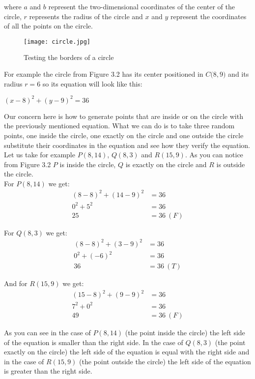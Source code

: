 where $a$ and $b$ represent the two-dimensional coordinates of the center of the circle, $r$ represents the radius of the circle and $x$ and $y$ represent the coordinates of all the points on the circle.\\

\begin{figure}[h]
	\caption{Testing the borders of a circle}
	\centering
	\texttt{[image: circle.jpg]}
\end{figure}

For example the circle from Figure 3.2 has its center positioned in $C\big(8, 9\big)$ and its radius $r = 6$ so its equation will look like this:

\begin{center}
	$(x - 8) ^ 2 + (y - 9) ^ 2 = 36$
\end{center}

\newpage
Our concern here is how to generate points that are inside or on the circle with the previously mentioned equation. What we can do is to take three random points, one inside the circle, one exactly on the circle and one outside the circle substitute their coordinates in the equation and see how they verify the equation. Let us take for example $P(8, 14)$, $Q(8, 3)$ and $R(15, 9)$. As you can notice from Figure 3.2 $P$ is inside the circle, $Q$ is exactly on the circle and $R$ is outside the circle.\\

For $P(8, 14)$ we get:
\begin{align*}
	(8 - 8) ^ 2 + (14 - 9) ^ 2 &= 36\\
	0 ^ 2 + 5 ^ 2 &= 36\\
	25 &= 36\ (F)
\end{align*}

For $Q(8, 3)$ we get:
\begin{align*}
(8 - 8) ^ 2 + (3 - 9) ^ 2 &= 36\\
0 ^ 2 + (-6) ^ 2 &= 36\\
36 &= 36\ (T)
\end{align*}

And for $R(15, 9)$ we get:
\begin{align*}
(15 - 8) ^ 2 + (9 - 9) ^ 2 &= 36\\
7 ^ 2 + 0 ^ 2 &= 36\\
49 &= 36\ (F)
\end{align*}

As you can see in the case of $P(8, 14)$ (the point inside the circle) the left side of the equation is smaller than the right side. In the case of $Q(8, 3)$ (the point exactly on the circle) the left side of the equation is equal with the right side and in the case of $R(15, 9)$ (the point outside the circle) the left side of the equation is greater than the right side.\\


